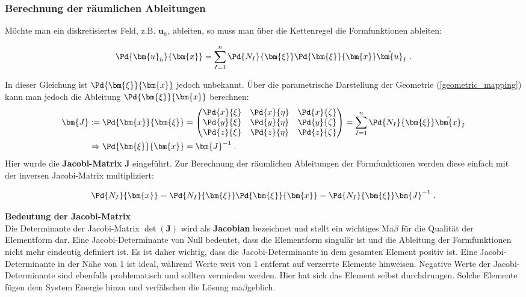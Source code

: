 \subsubsection{Berechnung der räumlichen Ableitungen}

Möchte man ein diskretisiertes Feld, z.B. $\bm{u}_h$, ableiten, so muss man über die Kettenregel die Formfunktionen ableiten:

\begin{align}
\Pd{\bm{u}_h}{\bm{x}} = \sum_{I=1}^{n} \Pd{N_I}{\bm{\xi}} \Pd{\bm{\xi}}{\bm{x}}  \hat{\bm{u}}_I \;.
\end{align}

In dieser Gleichung ist $\Pd{\bm{\xi}}{\bm{x}}$ jedoch unbekannt. Über die parametrische Darstellung der Geometrie (\ref{geometric_mapping}) kann man jedoch die Ableitung $\Pd{\bm{\xi}}{\bm{x}}$ berechnen:
\begin{align}
\bm{J} := \Pd{\bm{x}}{\bm{\xi}} & = \begin{pmatrix}
\Pd{x}{\xi} & \Pd{x}{\eta} & \Pd{x}{\zeta} \\
\Pd{y}{\xi} & \Pd{y}{\eta} & \Pd{y}{\zeta} \\
\Pd{z}{\xi} & \Pd{z}{\eta} & \Pd{z}{\zeta} 
\end{pmatrix}
=  \sum_{I=1}^{n} \Pd{N_I}{\bm{\xi}} \hat{\bm{x}}_I \\
\Rightarrow \Pd{\bm{\xi}}{\bm{x}} & = \bm{J}^{-1} \; .
\end{align}
Hier wurde die \textbf{Jacobi-Matrix} $\bm{J}$ eingeführt. Zur Berechnung der räumlichen Ableitungen der Formfunktionen werden diese einfach mit der inversen Jacobi-Matrix multipliziert:

\begin{equation}
\label{ableitungFormfunktion_03}
\Pd{N_I}{\bm{x}} = \Pd{N_I}{\bm{\xi}} \Pd{\bm{\xi}}{\bm{x}} = \Pd{N_I}{\bm{\xi}} \bm{J}^{-1} \; .
\end{equation}

\begin{framed}
\textbf{Bedeutung der Jacobi-Matrix}\\
Die Determinante der Jacobi-Matrix $\det(\bm{J})$ wird als \textbf{Jacobian} bezeichnet und stellt ein wichtiges Ma$\beta$ für die Qualität der Elementform dar. Eine Jacobi-Determinante von Null bedeutet, dass die Elementform singulär ist und die Ableitung der Formfunktionen nicht mehr eindeutig definiert ist. Es ist daher wichtig, dass die Jacobi-Determinante in dem gesamten Element positiv ist. Eine Jacobi-Determinante in der Nähe von 1 ist ideal, während Werte weit von 1 entfernt auf verzerrte Elemente hinweisen. Negative Werte der Jacobi-Determinante sind ebenfalls problematisch und sollten vermieden werden. Hier hat sich das Element selbst durchdrungen. Solche Elemente fügen dem System Energie hinzu und verfälschen die Lösung ma$\beta$geblich.
\end{framed}

